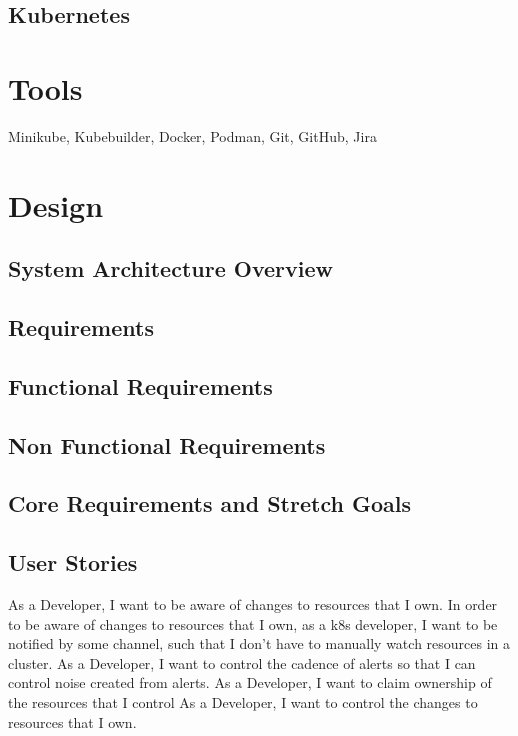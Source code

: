\documentclass{article}
\begin{document}
\subsection{Kubernetes}



\section{Tools}
Minikube, Kubebuilder, Docker, Podman, Git, GitHub, Jira



\section{Design}



\subsection{System Architecture Overview}



\subsection{Requirements}



\subsection{Functional Requirements}



\subsection{Non Functional Requirements}



\subsection{Core Requirements and Stretch Goals}



\subsection{User Stories}
As a Developer, I want to be aware of changes to resources that I own.
In order to be aware of changes to resources that I own, as a k8s developer, I want to be notified by some channel, such that I don’t have to manually watch resources in a cluster.
As a Developer, I want to control the cadence of alerts so that I can control noise created from alerts.
As a Developer, I want to claim ownership of the resources that I control
As a Developer, I want to control the changes to resources that I own.
\end{document}
